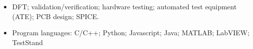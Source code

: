 \documentclass[class=article, crop=false]{standalone}
\begin{document}
\begin{itemize}[leftmargin=*]

    \item DFT; validation/verification; hardware testing; automated test equipment (ATE);
    PCB design; SPICE.

    \item Program languages: C/C++; Python; Javascript; Java; MATLAB; LabVIEW; 
    TestStand

\end{itemize}
\end{document}

